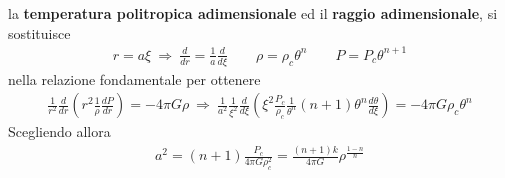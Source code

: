 \documentclass[a4paper, oneside]{book}
\begin{document}
la \textbf{temperatura politropica adimensionale} ed il \textbf{raggio adimensionale}, si sostituisce
\begin{gather*}
    r = a\xi \ \Longrightarrow \ \frac{d}{dr} = \frac{1}{a}\frac{d}{d\xi} \qquad \rho = \rho_c\theta^{n} \qquad P = P_c\theta^{n + 1}
\end{gather*}
nella relazione fondamentale per ottenere 
\begin{gather*}
    \frac{1}{r^{2}} \frac{d}{dr}\left(r^{2} \frac{1}{\rho} \frac{dP}{dr}\right) = -4\pi G\rho \ \Longrightarrow \ \frac{1}{a^{2}}\frac{1}{\xi^{2}} \frac{d}{d\xi} \left(\xi^{2} \frac{P_c}{\rho_c} \frac{1}{\theta^{n}}(n + 1)\theta^{n} \frac{d\theta}{d\xi}\right) = -4\pi G\rho_c \theta^{n}
\end{gather*} 
Scegliendo allora 
\begin{gather*}
    a^{2} = (n + 1) \frac{P_c}{4\pi G \rho_c^{2}} = \frac{(n + 1)k}{4\pi G}\rho^{\frac{1 - n}{n}}
\end{gather*}
\end{document}

